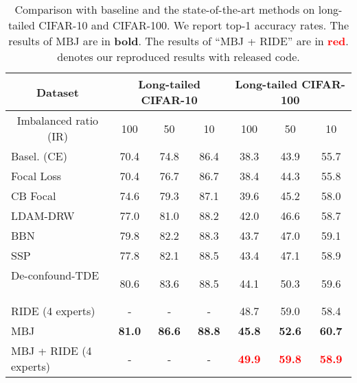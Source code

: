 \documentclass[final]{cvpr}
\begin{document}
\begin{table*}[tb]
\small 
	\centering
	\setlength{\tabcolsep}{18.5pt}
	\begin{tabular}{l|ccc|ccc}
		\hline
		\multicolumn{1}{c|}{Dataset}          & \multicolumn{3}{c|}{Long-tailed CIFAR-10} & \multicolumn{3}{c}{Long-tailed CIFAR-100}       \\ \hline
		\multicolumn{1}{c|}{Imbalanced ratio (IR)} & 100             & 50              & 10    & 100            & 50             & 10             \\ \hline
		Basel. (CE)                           & 70.4           & 74.8           & 86.4 & 38.3          & 43.9          & 55.7          \\
		Focal Loss  ~\cite{focalloss}                      & 70.4           & 76.7           & 86.7 & 38.4          & 44.3          & 55.8          \\
		CB Focal ~\cite{cb-focal}                            & 74.6           & 79.3           & 87.1  & 39.6          & 45.2          & 58.0          \\
		LDAM-DRW ~\cite{LDAM}                             & 77.0           & 81.0           & 88.2 & 42.0          & 46.6          & 58.7          \\
		BBN ~\cite{BBN}                                  & 79.8           & 82.2           & 88.3 & 43.7          & 47.0          & 59.1          \\
		SSP ~\cite{yang2020rethinking}                                  & 77.8           & 82.1           & 88.5 & 43.4          & 47.1          & 58.9          \\ 
		De-confound-TDE  ~\cite{tang2020long}                     & 80.6            & 83.6            & 88.5  & 44.1           & 50.3           & 59.6           \\
		RIDE (4 experts)  ~\cite{wang2020long}                     & -            & -            & -  & 48.7           & 59.0           & 58.4           \\
		\hline
		MBJ                                   & \textbf{81.0}  & \textbf{86.6}  & \textbf{88.8} & \textbf{45.8} & \textbf{52.6} & \textbf{60.7} \\
		MBJ + RIDE (4 experts)                & -              & -              &-              & \textbf{\textcolor{red}{49.9}}          & \textbf{\textcolor{red}{59.8}}             & \textbf{\textcolor{red}{58.9}}             \\ 
		\hline
	\end{tabular}
	\caption{Comparison with baseline and the state-of-the-art methods on long-tailed CIFAR-10 and CIFAR-100. We report top-1 accuracy rates. The results of MBJ are in \textbf{bold}. The results of ``MBJ + RIDE'' are in \textbf{\textcolor{red}{red}}.   denotes our reproduced results with released code. }
	\label{tab:CIFAR}
\end{table*}
\end{document}
